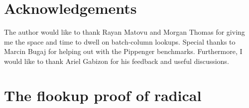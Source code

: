 \documentclass[11pt]{article}
\theoremstyle{definition}
\theoremstyle{definition}
\begin{document}

\section{Acknowledgements}

The author would like to thank Rayan Matovu and Morgan Thomas for giving me the space and time to dwell on batch-column lookups. 
Special thanks to Marcin Bugaj for helping out with the Pippenger benchmarks.
Furthermore, I would like to thank Ariel Gabizon for his feedback and useful discussions.







\newpage
\appendix
\section{The flookup proof of radical}
\label{s:uv:flookup}
\end{document}
